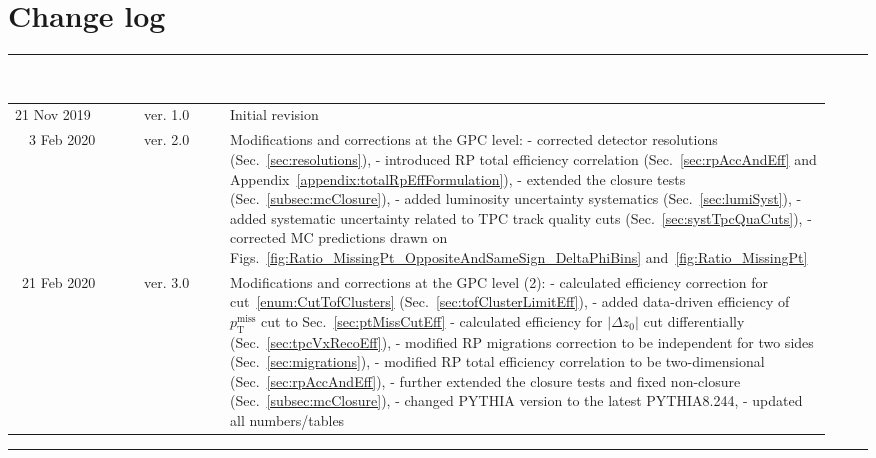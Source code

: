 \section*{\LARGE Change log}%
%
  \rule{\textwidth}{1.0pt}\\[5pt]%
  \begin{tabular}{>{\raggedright}p{0.15\linewidth}p{0.1\linewidth}p{0.7\linewidth}}
  	21 Nov 2019 & ver. 1.0 & Initial revision\newline%
  	\\[-1pt]%
  	~~3 Feb 2020 & ver. 2.0 & Modifications and corrections at the GPC level:%
  	\newline- corrected detector resolutions (Sec.~\ref{sec:resolutions}),%
  	\newline- introduced RP total efficiency correlation (Sec.~\ref{sec:rpAccAndEff} and Appendix~\ref{appendix:totalRpEffFormulation}),%
  	\newline- extended the closure tests (Sec.~\ref{subsec:mcClosure}),%
  	\newline- added luminosity uncertainty systematics (Sec.~\ref{sec:lumiSyst}),%
  	\newline- added systematic uncertainty related to TPC track quality cuts (Sec.~\ref{sec:systTpcQuaCuts}),%
  	\newline- corrected MC predictions drawn on Figs.~\ref{fig:Ratio_MissingPt_OppositeAndSameSign_DeltaPhiBins} and~\ref{fig:Ratio_MissingPt}\newline%
  	\\[-1pt]%
  	~21 Feb 2020 & ver. 3.0 & Modifications and corrections at the GPC level (2):%
  	\newline- calculated efficiency correction for cut~\ref{enum:CutTofClusters} (Sec.~\ref{sec:tofClusterLimitEff}),%
  	\newline- added data-driven efficiency of $p_{\text{T}}^{\text{miss}}$ cut to Sec.~\ref{sec:ptMissCutEff}
  	\newline- calculated efficiency for $|\Delta z_{0}|$ cut differentially (Sec.~\ref{sec:tpcVxRecoEff}),%
  	\newline- modified RP migrations correction to be independent for two sides (Sec.~\ref{sec:migrations}),%
  	\newline- modified RP total efficiency correlation to be two-dimensional (Sec.~\ref{sec:rpAccAndEff}),%
  	\newline- further extended the closure tests and fixed non-closure (Sec.~\ref{subsec:mcClosure}),%
  	\newline- changed PYTHIA version to the latest PYTHIA8.244,%
  	\newline- updated all numbers/tables
  \end{tabular}\newline%
 \rule{\textwidth}{1.0pt}
